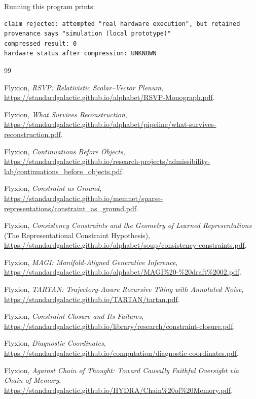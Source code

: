 \documentclass[11pt]{article}
\begin{document}
Running this program prints:

\begin{lstlisting}[numbers=none]
claim rejected: attempted "real hardware execution", but retained
provenance says "simulation (local prototype)"
compressed result: 0
hardware status after compression: UNKNOWN
\end{lstlisting}

\begin{thebibliography}{99}

 Flyxion, \textit{RSVP: Relativistic Scalar--Vector Plenum}, \url{https://standardgalactic.github.io/alphabet/RSVP-Monograph.pdf}.

 Flyxion, \textit{What Survives Reconstruction}, \url{https://standardgalactic.github.io/alphabet/pipeline/what-survives-reconstruction.pdf}.

 Flyxion, \textit{Continuations Before Objects}, \url{https://standardgalactic.github.io/research-projects/admissibility-lab/continuations_before_objects.pdf}.

 Flyxion, \textit{Constraint as Ground}, \url{https://standardgalactic.github.io/memnet/sparse-representations/constraint_as_ground.pdf}.

 Flyxion, \textit{Consistency Constraints and the Geometry of Learned Representations} (The Representational Constraint Hypothesis), \url{https://standardgalactic.github.io/alphabet/soup/consistency-constraints.pdf}.

 Flyxion, \textit{MAGI: Manifold-Aligned Generative Inference}, \url{https://standardgalactic.github.io/alphabet/MAGI\%20-\%20draft\%2002.pdf}.

 Flyxion, \textit{TARTAN: Trajectory-Aware Recursive Tiling with Annotated Noise}, \url{https://standardgalactic.github.io/TARTAN/tartan.pdf}.

 Flyxion, \textit{Constraint Closure and Its Failures}, \url{https://standardgalactic.github.io/library/research/constraint-closure.pdf}.

 Flyxion, \textit{Diagnostic Coordinates}, \url{https://standardgalactic.github.io/computation/diagnostic-coordinates.pdf}.

 Flyxion, \textit{Against Chain of Thought: Toward Causally Faithful Oversight via Chain of Memory}, \url{https://standardgalactic.github.io/HYDRA/Chain\%20of\%20Memory.pdf}.


\end{thebibliography}
\end{document}
